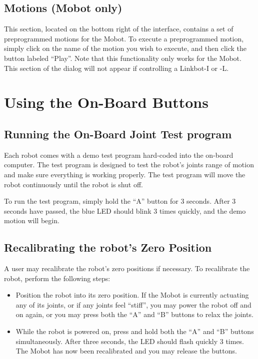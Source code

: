 \documentclass{article}
\begin{document}
\subsection{Motions (Mobot only)}
This section, located on the bottom right of the interface, contains a set of
preprogrammed motions for the Mobot. To execute a preprogrammed motion, simply
click on the name of the motion you wish to execute, and then click the button
labeled ``Play''. Note that this functionality only works for the Mobot. 
This section of the dialog will not appear if controlling a Linkbot-I or -L.

\section{Using the On-Board Buttons}
\subsection{Running the On-Board Joint Test program}
Each robot comes with a demo test program hard-coded into the on-board
computer. The test program is designed to test the robot's joints range of 
motion and make sure everything is working properly. The test program will
move the robot continuously until the robot is shut off.

To run the test program, simply hold the ``A'' button for 3 seconds. After
3 seconds have passed, the blue LED should blink 3 times quickly, and the
demo motion will begin.

\subsection{Recalibrating the robot's Zero Position}
A user may recalibrate the robot's zero positions if necessary. To recalibrate
the robot, perform the following steps:
\begin{itemize}
\item Position the robot into its zero position. If the Mobot is currently
actuating any of its joints, or if any joints feel ``stiff'', you may power the
robot off and on again, or you may press both the ``A'' and ``B'' buttons to relax the 
joints.
\item While the robot is powered on, press and hold both the ``A'' and ``B'' buttons
simultaneously. After three seconds, the LED should flash quickly 3 times. The Mobot has now
been recalibrated and you may release the buttons.
\end{itemize}
\end{document}
